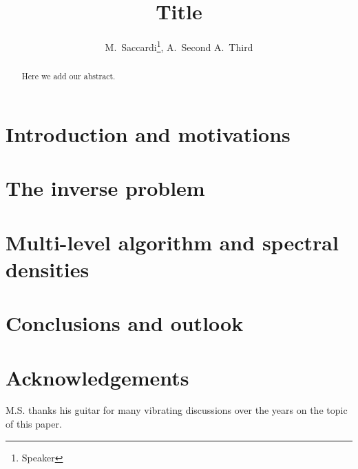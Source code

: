 \documentclass[preprint]{cimento} %
\title{Title}
\author{M.~Saccardi\from{UNIMIB-INFN}\thanks{Speaker}, A.~Second\from{SECOND} \atque A.~Third\from{THIRD}}
\begin{document}
\maketitle

\begin{abstract}
Here we add our abstract.
\end{abstract}

\section{Introduction and motivations\label{sec:intro}}


\section{The inverse problem\label{sec:1}}


\section{Multi-level algorithm and spectral densities\label{sec:2}}


\section{Conclusions and outlook\label{sec:concl}}


\section{Acknowledgements}
M.S. thanks his guitar for many vibrating discussions over the years on the topic of this paper.


\end{document}
